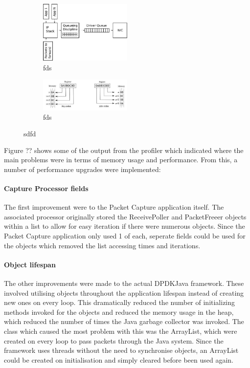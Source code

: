 \documentclass[final_report.tex]{subfiles}
\begin{document}
\begin{figure}
	\centering
	\begin{subfigure}{0.5\textwidth}
		\centering
		\includegraphics[width=0.5\textwidth]{img/buffer.jpg}
		\caption{fds}
		\label{sdf}
	\end{subfigure}%
	\begin{subfigure}{0.5\textwidth}
		\centering
		\includegraphics[width=0.5\textwidth]{img/endian.png}
		\caption{fds}
		\label{sdf}
	\end{subfigure}
	\caption{sdfd}
	\label{fdssdf}
\end{figure}

Figure ?? shows some of the output from the profiler which indicated where the main problems were in terms of memory usage and performance. From this, a number of performance upgrades were implemented:

\paragraph*{Capture Processor fields}
The first improvement were to the Packet Capture application itself. The associated processor originally stored the ReceivePoller and PacketFreeer objects within a list to allow for easy iteration if there were numerous objects. Since the Packet Capture application only used 1 of each, seperate fields could be used for the objects which removed the list accessing times and iterations.

\paragraph*{Object lifespan}
The other improvements were made to the actual DPDKJava framework. These involved utilising objects throughout the application lifespan instead of creating new ones on every loop. This dramatically reduced the number of initializing methods invoked for the objects and reduced the memory usage in the heap, which reduced the number of times the Java garbage collector was invoked. The class which caused the most problem with this was the ArrayList, which were created on every loop to pass packets through the Java system. Since the framework uses threads without the need to synchronise objects, an ArrayList could be created on initialisation and simply cleared before been used again.
\end{document}
